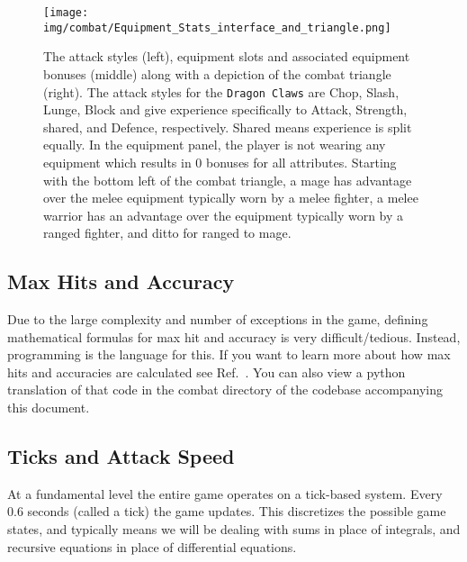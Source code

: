 


		\begin{figure}
			\centering
			\texttt{[image: img/combat/Equipment\_Stats\_interface\_and\_triangle.png]}
			\caption{The attack styles (left), equipment slots and associated equipment bonuses (middle) along with a depiction of the combat triangle (right). The attack styles for the \texttt{Dragon Claws} are Chop, Slash, Lunge, Block and give experience specifically to Attack, Strength, shared, and Defence, respectively. Shared means experience is split equally. In the equipment panel, the player is not wearing any equipment which results in 0 bonuses for all attributes. Starting with the bottom left of the combat triangle, a mage has advantage over the melee equipment typically worn by a melee fighter, a melee warrior has an advantage over the equipment typically worn by a ranged fighter, and ditto for ranged to mage.
			}
			\label{fig:equipment_stats_and_triangle}
		\end{figure}

	\subsection{Max Hits and Accuracy}
		Due to the large complexity and number of exceptions in the game, defining mathematical formulas for max hit and accuracy is very difficult/tedious. Instead, programming is the language for this. If you want to learn more about how max hits and accuracies are calculated see Ref.~\cite{bitter:dps_calculator}. You can also view a python translation of that code in the combat directory of the codebase accompanying this document.

	\subsection{Ticks and Attack Speed}
		At a fundamental level the entire game operates on a tick-based system. Every 0.6 seconds (called a tick) the game updates. This discretizes the possible game states, and typically means we will be dealing with sums in place of integrals, and recursive equations in place of differential equations.

